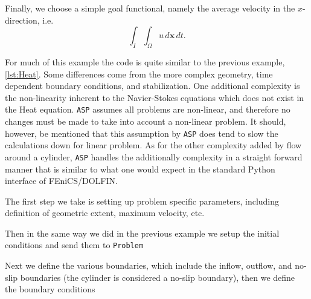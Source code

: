     Finally, we choose a simple goal functional, namely the average velocity in
    the $x$-direction, i.e.
    \begin{equation}
        \int_{I}\!\int_{\Omega} u\, d\mathbf{x}\,dt.
        \label{eq:NSEGoal}
    \end{equation}

    For much of this example the code is quite similar to the previous example,
    \autoref{lst:Heat}.  Some differences come from the more complex geometry,
    time dependent boundary conditions, and stabilization. One additional
    complexity is the non-linearity inherent to the Navier-Stokes equations
    which does not exist in the Heat equation. \texttt{ASP} assumes all problems are
    non-linear, and therefore no changes must be made to take into account a
    non-linear problem.  It should, however, be mentioned that this assumption
    by \texttt{ASP} does tend to slow the calculations down for linear problem. As for
    the other complexity added by flow around a cylinder, \texttt{ASP} handles the
    additionally complexity in a straight forward manner that is similar to what
    one would expect in the standard Python interface of FEniCS/DOLFIN.

    The first step we take is setting up problem specific parameters, including
    definition of geometric extent, maximum velocity, etc.
    
    
    Then in the same way we did in the previous example we setup the initial
    conditions and send them to \texttt{Problem}
    
    

    Next we define the various boundaries, which include the inflow, outflow,
    and no-slip boundaries (the cylinder is considered a no-slip boundary), then
    we define the boundary conditions
    
    

